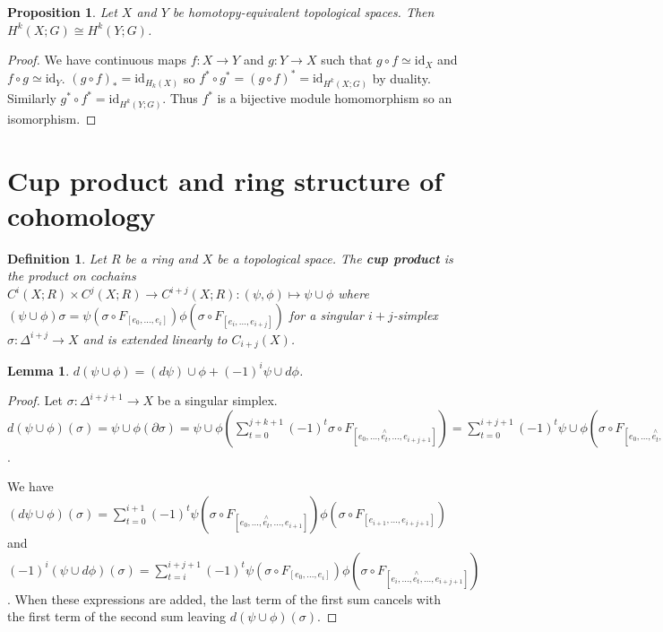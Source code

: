 \documentclass{report}
\newtheorem{definition}{Definition}
\newtheorem{lemma}{Lemma}
\newtheorem{proposition}{Proposition}
\begin{document}
\begin{proposition}
Let $X$ and $Y$ be homotopy-equivalent topological spaces. Then $H^k(X;G)\cong H^k(Y;G)$.
\end{proposition}
\begin{proof}
We have continuous maps $f\colon X\to Y$ and $g\colon Y\to X$ such that $g\circ f\simeq\text{id}_X$ and $f\circ g\simeq\text{id}_Y$. $(g\circ f)_*=\text{id}_{H_k(X)}$ so $f^*\circ g^*=(g\circ f)^*=\text{id}_{H^k(X;G)}$ by duality. Similarly $g^*\circ f^*=\text{id}_{H^k(Y;G)}$. Thus $f^*$ is a bijective module homomorphism so an isomorphism.
\end{proof}


\section{Cup product and ring structure of cohomology}
\begin{definition}
Let $R$ be a ring and $X$ be a topological space. The \textbf{cup product} is the product on cochains $C^i(X;R)\times C^j(X;R)\to C^{i+j}(X;R):(\psi,\phi)\mapsto\psi\cup\phi$ where $(\psi\cup\phi)\sigma=\psi(\sigma\circ F_{[e_0,...,e_i]})\phi(\sigma\circ F_{[e_i,...,e_{i+j}]})$ for a singular $i+j$-simplex $\sigma\colon\Delta^{i+j}\to X$ and is extended linearly to $C_{i+j}(X)$.
\end{definition}

\begin{lemma}
$d(\psi\cup\phi)=(d\psi)\cup\phi+(-1)^i\psi\cup d\phi$.
\end{lemma}
\begin{proof}
Let $\sigma\colon\Delta^{i+j+1}\to X$ be a singular simplex.
$d(\psi\cup\phi)(\sigma)=\psi\cup\phi(\partial\sigma)=\psi\cup\phi(\sum_{t=0}^{j+k+1}(-1)^t\sigma\circ F_{[e_0,...,\overset{\wedge}{e_t},...,e_{i+j+1}]})=\sum_{t=0}^{i+j+1}(-1)^t\psi\cup\phi(\sigma\circ F_{[e_0,...,\overset{\wedge}{e_t},...,e_{i+j+1}]})=\sum_{t=0}^{i}(-1)^t\psi\cup\phi(\sigma\circ F_{[e_0,...,\overset{\wedge}{e_t},...,e_{i+j+1}]})+\sum_{t=i+1}^{i+j+1}(-1)^t\psi\cup\phi(\sigma\circ F_{[e_0,...,\overset{\wedge}{e_t},...,e_{i+j+1}]})=\sum_{t=0}^i(-1)^t\psi(\sigma\circ F_{[e_0,...,\overset{\wedge}{e_t},...,e_{i+1}]})\phi(\sigma\circ F_{[e_{i+1},...,e_{i+j+1}]})+\sum_{t=i+1}^{i+j+1}(-1)^t\psi(\sigma\circ F_{[e_0,...,e_{i}]})\phi(\sigma\circ F_{[e_{i},...,\overset{\wedge}{e_t},...,e_{i+j+1}]})=\sum_{t=0}^{i+1}(-1)^t\psi(\sigma\circ F_{[e_0,...,\overset{\wedge}{e_t},...,e_{i+1}]})\phi(\sigma\circ F_{[e_{i+1},...,e_{i+j+1}]})+\sum_{t=i}^{i+j+1}(-1)^t\psi(\sigma\circ F_{[e_0,...,e_{i}]})\phi(\sigma\circ F_{[e_{i},...,\overset{\wedge}{e_t},...,e_{i+j+1}]})$.

\noindent We have $(d\psi\cup\phi)(\sigma)=\sum_{t=0}^{i+1}(-1)^t\psi(\sigma\circ F_{[e_0,...,\overset{\wedge}{e_t},...,e_{i+1}]})\phi(\sigma\circ F_{[e_{i+1},...,e_{i+j+1}]})$
and $(-1)^i(\psi\cup d\phi)(\sigma)=\sum_{t=i}^{i+j+1}(-1)^t\psi(\sigma\circ F_{[e_0,...,e_i]})\phi(\sigma\circ F_{[e_i,...,\overset{\wedge}{e_t},...,e_{i+j+1}]})$. When these expressions are added, the last term of the first sum cancels with the first term of the second sum leaving $d(\psi\cup\phi)(\sigma)$.
\end{proof}
\end{document}
